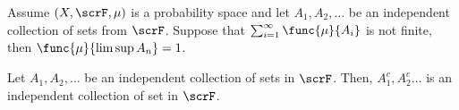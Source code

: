 \begin{theorem}
    Assume \((X,\scrF,\mu)\) is a probability space and let \(A_1,A_2,\dots\) be an independent collection of sets from \(\scrF\). Suppose that \(\sum_{i = 1}^{\infty} \func{\mu}{A_i} \) is not finite, then \(\func{\mu}{\limsup A_n} =1\).
\end{theorem}

\begin{lemma}
    Let \(A_1, A_2 , \dots \) be an independent collection of sets in \(\scrF\). Then, \(A_1^c, A_2^c \dots\) is an independent collection of set in \(\scrF\).
\end{lemma}